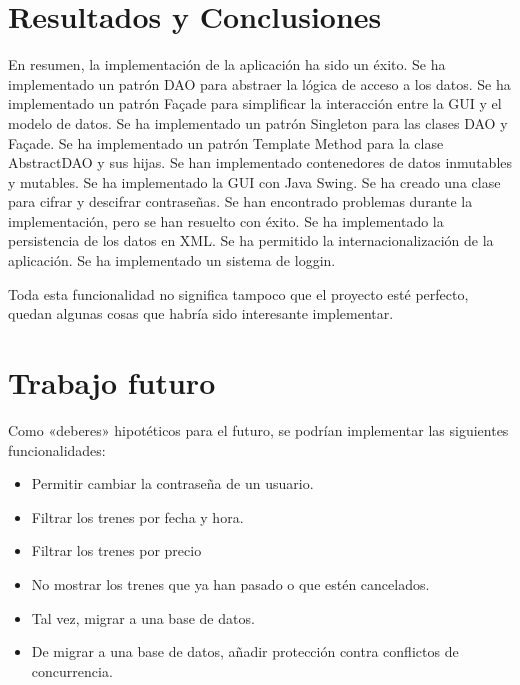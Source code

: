 \section{Resultados y Conclusiones}\label{sec:resultados_y_conclusiones}
En resumen, la implementación de la aplicación ha sido un éxito.
Se ha implementado un patrón DAO para abstraer la lógica de acceso a los datos.
Se ha implementado un patrón Façade para simplificar la interacción entre la GUI y el modelo de datos.
Se ha implementado un patrón Singleton para las clases DAO y Façade.
Se ha implementado un patrón Template Method para la clase AbstractDAO y sus hijas.
Se han implementado contenedores de datos inmutables y mutables.
Se ha implementado la GUI con Java Swing.
Se ha creado una clase para cifrar y descifrar contraseñas.
Se han encontrado problemas durante la implementación, pero se han resuelto con éxito.
Se ha implementado la persistencia de los datos en XML\@.
Se ha permitido la internacionalización de la aplicación.
Se ha implementado un sistema de loggin.

Toda esta funcionalidad no significa tampoco que el proyecto esté perfecto,
quedan algunas cosas que habría sido interesante implementar.

\section{Trabajo futuro}\label{sec:trabajo_futuro}
Como «deberes» hipotéticos para el futuro, se podrían implementar las siguientes funcionalidades:
\begin{itemize}
\item Permitir cambiar la contraseña de un usuario.
    \item Filtrar los trenes por fecha y hora.
    \item Filtrar los trenes por precio
    \item No mostrar los trenes que ya han pasado o que estén cancelados.
    \item Tal vez, migrar a una base de datos.
    \item De migrar a una base de datos, añadir protección contra conflictos de concurrencia.
\end{itemize}







